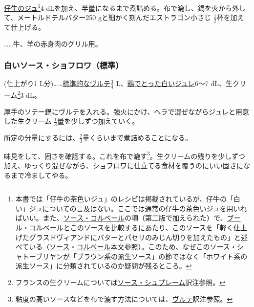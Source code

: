 \begin{recette}
\protect\hyperlink{jus-de-veau-brun}{仔牛のジュ}\footnote{本書では「仔牛の茶色いジュ」のレシピは掲載されているが、仔牛の「白い」ジュについての言及はない。ここでは通常の仔牛の茶色いジュを用いればいい。また、\protect\hyperlink{sauce-colbert}{ソース・コルベール}の項（第二版で加えられた）で、\protect\hyperlink{beurre-colbert}{ブール・コルベール}とこのソースを比較するにあたり、このソースを「軽く仕上げたグラスドヴィアンドにバターとパセリのみじん切りを加えたもの」と述べている（\protect\hyperlink{sauce-colbert}{ソース・コルベール}本文参照）。このため、なぜこのソース・シャトーブリヤンが「ブラウン系の派生ソース」の節ではなく「ホワイト系の派生ソース」に分類されているのか疑問が残るところ。}4
dLを加え、半量になるまで煮詰める。布で漉し、鍋を火から外して、メートルドテルバター250
gと細かく刻んだエストラゴン小さじ \(\frac{1}{2}\)杯を加えて仕上げる。

\ldots{}\ldots{}牛、羊の赤身肉のグリル用。

\hypertarget{sauce-chaud-froid-blanche-ordinaire}{%
\subsubsection{白いソース・ショフロワ（標準）}\label{sauce-chaud-froid-blanche-ordinaire}}



(仕上がり1
L分)\ldots{}\ldots{}\protect\hyperlink{veloute}{標準的なヴルテ}\(\frac{3}{4}\)
L、\protect\hyperlink{gelee-de-volaille}{鶏でとった白いジュレ}6〜7
dL、生クリーム\footnote{フランスの生クリームについては\protect\hyperlink{sauce-supreme}{ソース・シュプレーム}訳注参照。}3
dL。

厚手のソテー鍋にヴルテを入れる。強火にかけ、ヘラで混ぜながらジュレと用意した生クリーム
\(\frac{1}{3}\)量を少しずつ加えていく。

所定の分量にするには、\(\frac{2}{3}\)量くらいまで煮詰めることになる。

味見をして、固さを確認する。これを布で漉す\footnote{粘度の高いソースなどを布で漉す方法については、\protect\hyperlink{veloute}{ヴルテ}訳注参照。}。生クリームの残りを少しずつ加え、ゆっくり混ぜながら、ショフロワに仕立てる食材を覆うのにいい固さになるまで冷ましてやる。


\end{recette}
